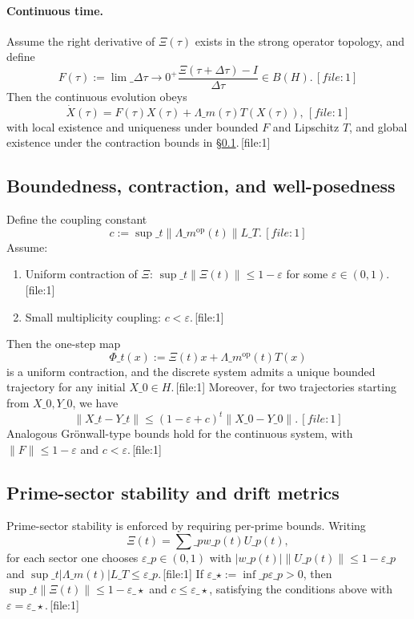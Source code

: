 \documentclass[11pt]{article}
\begin{document}
\paragraph{Continuous time.} Assume the right derivative of $\Xi(\tau)$ exists in the strong operator topology, and define
\[
F(\tau) := \lim\_{\Delta\tau\to 0^+} \frac{\Xi(\tau+\Delta\tau)-I}{\Delta\tau} \in B(H).\,[file:1]
\]
Then the continuous evolution obeys
\[
\dot{X}(\tau) = F(\tau) X(\tau) + \Lambda\_m(\tau) T(X(\tau)),\,[file:1]
\]
with local existence and uniqueness under bounded $F$ and Lipschitz $T$, and global existence under the contraction bounds in §\ref{sec:boundedness-contraction}.\,[file:1]

\subsection{Boundedness, contraction, and well-posedness}
\label{sec:boundedness-contraction}

Define the coupling constant
\[
c := \sup\_t\|\Lambda\_m^{\mathrm{op}}(t)\| L\_T.\,[file:1]
\]
Assume:
\begin{enumerate}[label=(\roman*),nosep]
  \item Uniform contraction of $\Xi$: $\sup\_t\|\Xi(t)\|\le 1-\varepsilon$ for some $\varepsilon\in(0,1)$.\,[file:1]
  \item Small multiplicity coupling: $c<\varepsilon$.\,[file:1]
\end{enumerate}
Then the one-step map
\[
\Phi\_t(x) := \Xi(t)x + \Lambda\_m^{\mathrm{op}}(t)T(x)
\]
is a uniform contraction, and the discrete system admits a unique bounded trajectory for any initial $X\_0\in H$.\,[file:1] Moreover, for two trajectories starting from $X\_0,Y\_0$, we have
\[
\|X\_t - Y\_t\| \le (1-\varepsilon + c)^t \|X\_0-Y\_0\|.\,[file:1]
\]
Analogous Grönwall-type bounds hold for the continuous system, with $\|F\|\le 1-\varepsilon$ and $c<\varepsilon$.\,[file:1]

\subsection{Prime-sector stability and drift metrics}

Prime-sector stability is enforced by requiring per-prime bounds. Writing
\[
\Xi(t) = \sum\_p w\_p(t)U\_p(t),
\]
for each sector one chooses $\varepsilon\_p\in(0,1)$ with $|w\_p(t)|\|U\_p(t)\|\le 1-\varepsilon\_p$ and $\sup\_t|\Lambda\_m(t)|L\_T\le\varepsilon\_p$.\,[file:1] If $\varepsilon\_\star:=\inf\_p\varepsilon\_p>0$, then $\sup\_t\|\Xi(t)\|\le 1-\varepsilon\_\star$ and $c\le \varepsilon\_\star$, satisfying the conditions above with $\varepsilon=\varepsilon\_\star$.\,[file:1]
\end{document}
